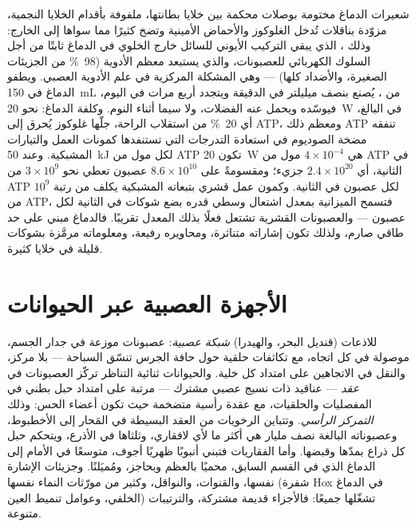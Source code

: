 \begin{proposition}\label{prop:b3:nervous-systems:barrier-budget}
شعيرات الدماغ مختومة بوصلات محكمة بين خلايا بطانتها، ملفوفة
بأقدام الخلايا النجمية، مزوّدة بناقلات تُدخل الغلوكوز
والأحماض الأمينية وتضخ كثيرًا مما سواها إلى الخارج: وذلك
\emph{}، الذي يبقي التركيب الأيوني
للسائل خارج الخلوي في الدماغ ثابتًا من أجل السلوك الكهربائي
للعصبونات، والذي يستبعد معظم الأدوية (\qty{98}{\%} من
الجزيئات الصغيرة، والأضداد كلها) --- وهي المشكلة المركزية في
علم الأدوية العصبي. ويطفو الدماغ في \qty{150}{mL} من
\emph{}، يُصنع بنصف ميليلتر في الدقيقة
ويتجدد أربع مرات في اليوم، فيوسّده ويحمل عنه الفضلات، ولا
سيما أثناء النوم. وكلفة الدماغ: نحو \qty{20}{W} في البالغ،
أي \qty{20}{\%} من استقلاب الراحة، جلّها غلوكوز يُحرق إلى
ATP، ومعظم ذلك ATP تنفقه مضخة الصوديوم في استعادة التدرجات
التي تستنفدها كمونات العمل والتيارات المشبكية. وعند
\qty{50}{kJ} لكل مول من ATP تكون \qty{20}{W} هي $4\times 10^{-4}$
مول من ATP في الثانية، أي $2.4\times 10^{20}$ جزيء؛ ومقسومةً على
$8.6\times 10^{10}$ عصبون تعطي نحو $3\times 10^{9}$ من ATP لكل
عصبون في الثانية. وكمون عمل قشري بتبعاته المشبكية يكلف من
رتبة $10^{9}$ من ATP، فتسمح الميزانية بمعدل اشتعال وسطي قدره
بضع شوكات في الثانية لكل عصبون --- والعصبونات القشرية تشتعل
فعلًا بذلك المعدل تقريبًا. فالدماغ مبني على حد طاقي صارم،
ولذلك تكون إشاراته متناثرة، ومحاويره رفيعة، ومعلوماته
مرمَّزة بشوكات قليلة في خلايا كثيرة.
\end{proposition}
\admitted

\section{الأجهزة العصبية عبر الحيوانات}

\begin{definition}\label{def:b3:nervous-systems:comparative}
للاذعات (قنديل البحر، والهيدرا) \emph{شبكة عصبية}: عصبونات
موزعة في جدار الجسم، موصولة في كل اتجاه، مع تكاثفات حلقية
حول حافة الجرس تنسّق السباحة --- بلا مركز، والنقل في
الاتجاهين على امتداد كل خلية. والحيوانات ثنائية التناظر
تركّز العصبونات في \emph{عقد} --- عناقيد ذات نسيج عصبي مشترك
--- مرتبة على امتداد حبل بطني في المفصليات والحلقيات، مع
عقدة رأسية متضخمة حيث تكون أعضاء الحس: وذلك \emph{التمركز
الرأسي}. وتتباين الرخويات من العقد البسيطة في المَحار إلى
الأخطبوط، وعصبوناته البالغة نصف مليار هي أكثر ما لأي
لافقاري، وثلثاها في الأذرع، ويتحكم حبل كل ذراع بمدّها
وقبضها. وأما الفقاريات فتبني أنبوبًا ظهريًا أجوف، متوسعًا
في الأمام إلى الدماغ الذي في القسم السابق، محميًا بالعظم
وبحاجز، ومُميَلنًا. وجزيئات الإشارة نفسها، والقنوات،
والنواقل، وكثير من مورّثات النماء نفسها (شفرة Hox في الدماغ
الخلفي، وعوامل تنميط العين) تشغّلها جميعًا: فالأجزاء قديمة
مشتركة، والترتيبات متنوعة.
\end{definition}

